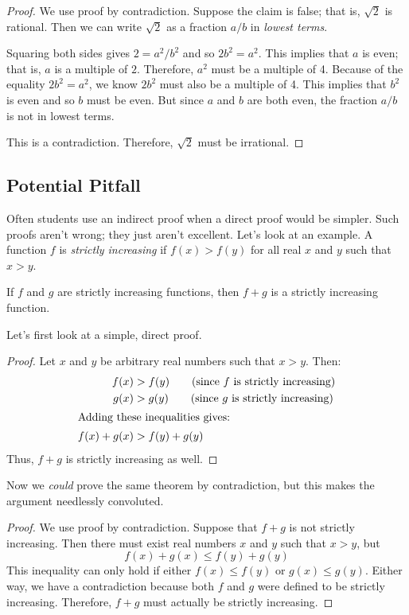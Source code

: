 \begin{proof}
We use proof by contradiction.  Suppose the claim is false; that is,
$\sqrt{2}$ is rational.  Then we can write $\sqrt{2}$ as a fraction
$a/b$ in \textit{lowest terms}.

Squaring both sides gives $2 = a^2 / b^2$ and so $2 b^2 = a^2$.  This
implies that $a$ is even; that is, $a$ is a multiple of $2$.
Therefore, $a^2$ must be a multiple of 4.  Because of the equality $2
b^2 = a^2$, we know $2 b^2$ must also be a multiple of 4.  This
implies that $b^2$ is even and so $b$ must be even.  But since $a$ and
$b$ are both even, the fraction $a/b$ is not in lowest terms.

This is a contradiction.  Therefore, $\sqrt{2}$ must be irrational.
\end{proof}

\iffalse
\subsection{Potential Pitfall}

Often students use an indirect proof when a direct proof would be
simpler.  Such proofs aren't wrong; they just aren't excellent.  Let's
look at an example.  A function $f$ is \textit{strictly increasing} if
$f(x) > f(y)$ for all real $x$ and $y$ such that $x > y$.

\begin{theorem}
If $f$ and $g$ are strictly increasing functions, then $f + g$ is a
strictly increasing function.
\end{theorem}

Let's first look at a simple, direct proof.

\begin{proof}
Let $x$ and $y$ be arbitrary real numbers such that $x > y$.  Then:
%
\begin{align*}
f(x) & > f(y) \qquad \text{(since $f$ is strictly increasing)} \\
g(x) & > g(y) \qquad \text{(since $g$ is strictly increasing)} \\
\intertext{Adding these inequalities gives:}
f(x) + g(x) & > f(y) + g(y)
\end{align*}
%
Thus, $f + g$ is strictly increasing as well.
\end{proof}

Now we \textit{could} prove the same theorem by contradiction, but
this makes the argument needlessly convoluted.

\begin{proof}
We use proof by contradiction.  Suppose that $f + g$ is not strictly
increasing.  Then there must exist real numbers $x$ and $y$ such that
$x > y$, but
%
\[
f(x) + g(x) \leq f(y) + g(y)
\]
%
This inequality can only hold if either $f(x) \leq f(y)$ or $g(x) \leq
g(y)$.  Either way, we have a contradiction because both $f$ and $g$
were defined to be strictly increasing.  Therefore, $f + g$ must
actually be strictly increasing.
\end{proof}

